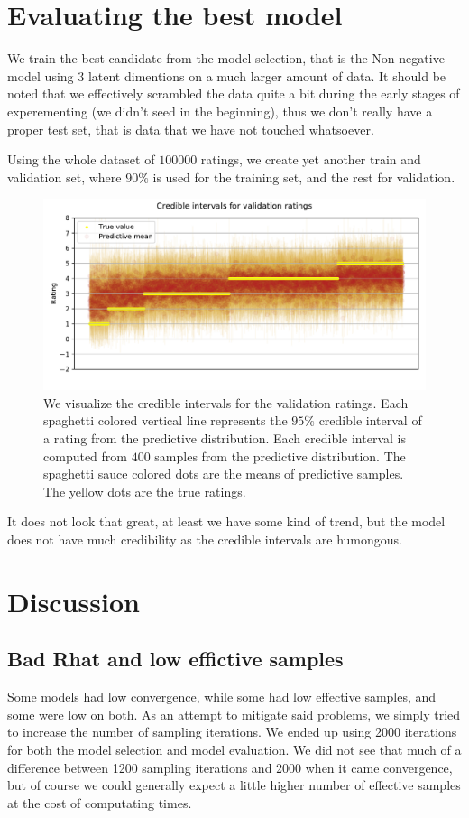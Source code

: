 \documentclass[12pt]{article}
\begin{document}
\section{Evaluating the best model}
We train the best candidate from the model selection, that is the Non-negative model using $3$ latent dimentions on a much larger amount of data. It should be noted that we effectively scrambled the data quite a bit during the early stages of experementing (we didn't seed in the beginning), thus we don't really have a proper test set, that is data that we have not touched whatsoever.

\vspace{5mm}
Using the whole dataset of $100000$ ratings, we create yet another train and validation set, where $90\%$ is used for the training set, and the rest for validation.

\begin{figure}[H]
    \centering
    \caption{We visualize the credible intervals for the validation ratings. Each spaghetti colored vertical line represents the $95\%$ credible interval of a rating from the predictive distribution. Each credible interval is computed from $400$ samples from the predictive distribution. The spaghetti sauce colored dots are the means of predictive samples. The yellow dots are the true ratings.}
    \includegraphics[width=\textwidth]{credibles.pdf}
\end{figure}
It does not look that great, at least we have some kind of trend, but the model does not have much credibility as the credible intervals are humongous. 

\section{Discussion}
    \subsection*{Bad Rhat and low effictive samples}
    Some models had low convergence, while some had low effective samples, and some were low on both. As an attempt to mitigate said problems, we simply tried to increase the number of sampling iterations. We ended up using 2000 iterations for both the model selection and model evaluation. We did not see that much of a difference between 1200 sampling iterations and 2000 when it came convergence, but of course we could generally expect a little higher number of effective samples at the cost of computating times.
\end{document}
